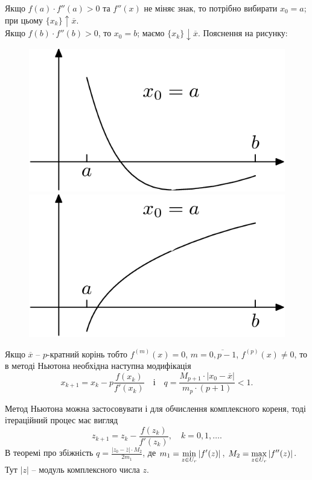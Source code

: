 Якщо $f(a) \cdot f''(a) > 0$ та $f''(x)$ не міняє знак, то потрібно вибирати $x_0 = a$; при цьому $\{x_k \}\uparrow \overline{x}$. \\

Якщо $f(b) \cdot f''(b) > 0$, то $x_0 = b$; маємо $\{x_k \}\downarrow \overline{x}$. Пояснення на рисунку:



\begin{figure}[H]
	\centering
	\includegraphics[width=.45\linewidth]{mal-2.png}
	\includegraphics[width=.45\linewidth]{mal-3.png}
\end{figure}

\begin{remark}
	Якщо $\overline{x}$ -- $p$-кратний корінь тобто $f^{(m)} (x) = 0$, $m = \overline{0,p-1}$, $f^{ (p)} (x) \ne 0$, то в методі Ньютона необхідна наступна модифікація \[x_{k+1} = x_k - p\dfrac{f(x_k)}{f'(x_k)} \quad \text{і} \quad q = \dfrac{M_{p+1}\cdot|x_0-\overline{x}|}{m_p \cdot (p+1)}<1.\]
\end{remark}

\begin{remark}
Метод Ньютона можна застосовувати і для обчислення комплексного кореня, тоді ітераційний процес має вигляд \[z_{k+1} = z_k - \dfrac{f(z_k)}{f'(z_k)}, \quad k = 0,1,\ldots.\] В теоремі про збіжність $q = \frac{|z_0-\overline{z}|\cdot M_2}{2m_1}$, де $m_1 = \displaystyle\min\limits_{z\in U_r} |f'(z)|$, $M_2 = \displaystyle\max\limits_{z\in U_r} |f''(z)|$. Тут $|z|$ -- модуль комплексного числа $z$.
\end{remark}

